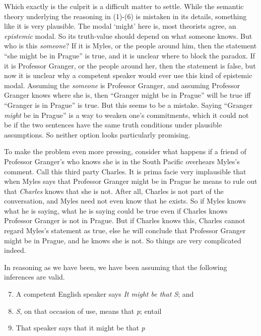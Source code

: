 Which exactly is the culprit is a difficult matter to settle. While the semantic theory underlying the reasoning in (1)-(6) is mistaken in its details, something like it is very plausible. The modal `might' here is, most theorists agree, an \textit{epistemic} modal. So its truth-value should depend on what someone knows. But who is this \textit{someone}? If it is Myles, or the people around him, then the statement ``she might be in Prague'' is true, and it is unclear where to block the paradox. If it is Professor Granger, or the people around her, then the statement is false, but now it is unclear why a competent speaker would ever use this kind of epistemic modal. Assuming the \textit{someone} is Professor Granger, and assuming Professor Granger knows where she is, then ``Granger might be in Prague'' will be true iff ``Granger is in Prague'' is true. But this seems to be a mistake. Saying ``Granger \textit{might} be in Prague'' is a way to weaken one's commitments, which it could not be if the two sentences have the same truth conditions under plausible assumptions. So neither option looks particularly promising.
 
To make the problem even more pressing, consider what happens if a friend of Professor Granger's who knows she is in the South Pacific overhears Myles's comment. Call this third party Charles. It is prima facie very implausible that when Myles says that Professor Granger might be in Prague he means to rule out that \textit{Charles} knows that she is not. After all, Charles is not part of the conversation, and Myles need not even know that he exists. So if Myles knows what he is saying, what he is saying could be true even if Charles knows Professor Granger is not in Prague. But if Charles knows this, Charles cannot regard Myles's 
statement as true, else he will conclude that Professor Granger might be in Prague, and he knows she is not. So things are very complicated indeed.
 
In reasoning as we have been, we have been assuming that the following 
inferences are valid.
 
\begin{enumerate}
\setcounter{enumi}{6}
\item A competent English speaker says \textit{It might be that S}; and
\item \textit{S}, on that occasion of use, means that \textit{p}; entail
\item That speaker says that it might be that \textit{p}
\end{enumerate}


